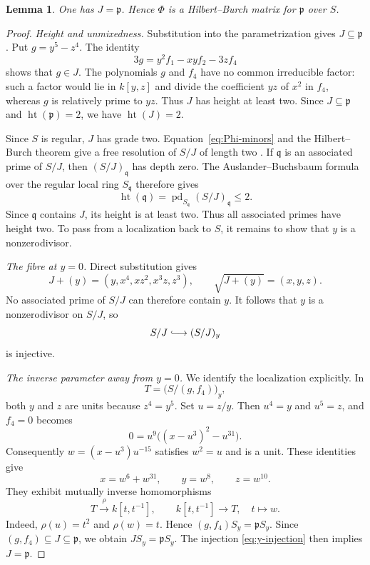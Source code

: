\documentclass[11pt]{amsart}
\newtheorem{lemma}[theorem]{Lemma}
\theoremstyle{remark}
\begin{document}
\begin{lemma}\label{lem:global-kernel}
One has $J=\mathfrak p$. Hence $\Phi$ is a Hilbert--Burch matrix for $\mathfrak p$ over $S$.
\end{lemma}

\begin{proof}
\emph{Height and unmixedness.} Substitution into the parametrization gives $J\subseteq\mathfrak p$. Put $g=y^5-z^4$. The identity
\begin{equation}\label{eq:g-certificate}
 3g=y^2f_1-xyf_2-3zf_4
\end{equation}
shows that $g\in J$. The polynomials $g$ and $f_4$ have no common irreducible factor: such a factor would lie in $k[y,z]$ and divide the coefficient $yz$ of $x^2$ in $f_4$, whereas $g$ is relatively prime to $yz$. Thus $J$ has height at least two. Since $J\subseteq\mathfrak p$ and $\operatorname{ht}(\mathfrak p)=2$, we have $\operatorname{ht}(J)=2$.

Since $S$ is regular, $J$ has grade two. Equation~\eqref{eq:Phi-minors} and the Hilbert--Burch theorem give a free resolution of $S/J$ of length two \cite[Theorem~20.15, pp.~502--503]{Eisenbud1995}. If $\mathfrak q$ is an associated prime of $S/J$, then $(S/J)_{\mathfrak q}$ has depth zero. The Auslander--Buchsbaum formula over the regular local ring $S_{\mathfrak q}$ \cite[Tag~090U]{Stacks} therefore gives
\[
 \operatorname{ht}(\mathfrak q)
 =\operatorname{pd}_{S_{\mathfrak q}}(S/J)_{\mathfrak q}\leq2.
\]
Since $\mathfrak q$ contains $J$, its height is at least two. Thus all associated primes have height two. To pass from a localization back to $S$, it remains to show that $y$ is a nonzerodivisor.

\emph{The fibre at $y=0$.} Direct substitution gives
\[
 J+(y)=(y,x^4,xz^2,x^3z,z^3),
 \qquad \sqrt{J+(y)}=(x,y,z).
\]
No associated prime of $S/J$ can therefore contain $y$. It follows that $y$ is a nonzerodivisor on $S/J$, so
\begin{equation}\label{eq:y-injection}
 S/J\lhook\joinrel\longrightarrow(S/J)_y
\end{equation}
is injective.

\emph{The inverse parameter away from $y=0$.} We identify the localization explicitly. In
\[
 T=\bigl(S/(g,f_4)\bigr)_y,
\]
both $y$ and $z$ are units because $z^4=y^5$. Set $u=z/y$. Then $u^4=y$ and $u^5=z$, and $f_4=0$ becomes
\[
 0=u^9\bigl((x-u^3)^2-u^{31}\bigr).
\]
Consequently $w=(x-u^3)u^{-15}$ satisfies $w^2=u$ and is a unit. These identities give
\[
 x=w^6+w^{31},\qquad y=w^8,\qquad z=w^{10}.
\]
They exhibit mutually inverse homomorphisms
\[
 T\xrightarrow{\ \rho\ }k[t,t^{-1}],\qquad
 k[t,t^{-1}]\longrightarrow T,\quad t\longmapsto w.
\]
Indeed, $\rho(u)=t^2$ and $\rho(w)=t$. Hence $(g,f_4)S_y=\mathfrak pS_y$. Since $(g,f_4)\subseteq J\subseteq\mathfrak p$, we obtain $J S_y=\mathfrak pS_y$. The injection \eqref{eq:y-injection} then implies $J=\mathfrak p$.
\end{proof}
\end{document}
